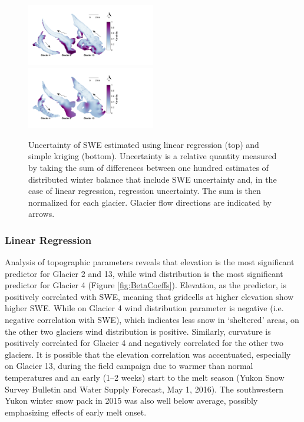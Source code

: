 \documentclass[twocolumn, letterpaper]{igs}
\begin{document}
\begin{figure}
	\centering
	\includegraphics[width =0.5\textwidth]{SpatialVar_LR.pdf}\\
	\includegraphics[width =0.5\textwidth]{SpatialVar_SK.pdf}\\
	\caption{Uncertainty of SWE estimated using linear regression (top) and simple kriging (bottom). Uncertainty is a relative quantity measured by taking the sum of differences between one hundred estimates of distributed winter balance that include SWE uncertainty and, in the case of linear regression, regression uncertainty. The sum is then normalized for each glacier. Glacier flow directions are indicated by arrows.}
	\label{fig:WSMBspatialvar}
\end{figure}

\subsubsection{Linear Regression}

Analysis of topographic parameters reveals that elevation is the most significant predictor for Glacier 2 and 13, while wind distribution is the most significant predictor for Glacier 4 (Figure \ref{fig:BetaCoeffs}). Elevation, as the predictor, is positively correlated with SWE, meaning that gridcells at higher elevation show higher SWE. While on Glacier 4 wind distribution parameter is negative (i.e. negative correlation with SWE), which indicates less snow in `sheltered' areas, on the other two glaciers wind distribution is positive. Similarly, curvature is positively correlated for Glacier 4 and negatively correlated for the other two glaciers. It is possible that the elevation correlation was accentuated, especially on Glacier 13, during the field campaign due to warmer than normal temperatures and an early (1--2 weeks) start to the melt season (Yukon Snow Survey Bulletin and Water Supply Forecast, May 1, 2016). The southwestern Yukon winter snow pack in 2015 was also well below average, possibly emphasizing effects of early melt onset. 
\end{document}
